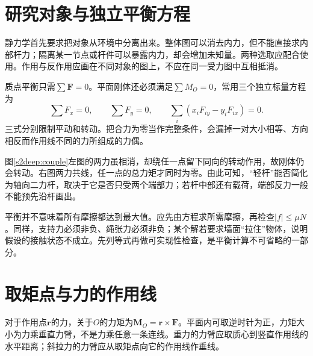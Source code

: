 \section{研究对象与独立平衡方程}
静力学首先要求把对象从环境中分离出来。整体图可以消去内力，但不能直接求内部杆力；隔离某一节点或杆件可以暴露内力，却会增加未知量。两种选取应配合使用。作用与反作用应画在不同对象的图上，不应在同一受力图中互相抵消。

质点平衡只需$\sum\boldsymbol F=0$。平面刚体还必须满足$\sum M_O=0$，常用三个独立标量方程为
\[
\sum F_x=0,\qquad \sum F_y=0,\qquad
\sum_i(x_iF_{iy}-y_iF_{ix})=0.
\]
三式分别限制平动和转动。把合力为零当作完整条件，会漏掉一对大小相等、方向相反而作用线不同的力所组成的力偶。

图\ref{s2deep:couple}左图的两力虽相消，却绕任一点留下同向的转动作用，故刚体仍会转动。右图两力共线，任一点的总力矩才同时为零。由此可知，“轻杆”能否简化为轴向二力杆，取决于它是否只受两个端部力；若杆中部还有载荷，端部反力一般不能预先沿杆画出。


平衡并不意味着所有摩擦都达到最大值。应先由方程求所需摩擦，再检查$|f|\le\mu N$。同样，支持力必须非负、绳张力必须非负；某个解若要求墙面“拉住”物体，说明假设的接触状态不成立。先列等式再做可实现性检查，是平衡计算不可省略的一部分。

\section{取矩点与力的作用线}
对于作用点$\boldsymbol r$的力，关于$O$的力矩为$\boldsymbol M_O=\boldsymbol r\times\boldsymbol F$。平面内可取逆时针为正，力矩大小为力乘垂直力臂，不是力乘任意一条连线。重力的力臂应取质心到竖直作用线的水平距离；斜拉力的力臂应从取矩点向它的作用线作垂线。

